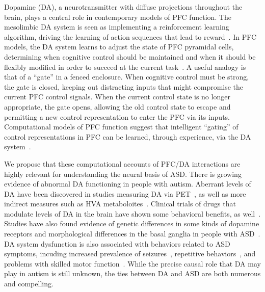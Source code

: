 Dopamine (DA), a neurotransmitter with diffuse projections throughout the brain, plays a central role in contemporary models of PFC function. The mesolimbic DA system is seen as implementing a reinforcement learning algorithm, driving the learning of action sequences that lead to reward~\cite{MontaguePR:1996:Dopamine,BartoAG:1994:TDLearning}. In PFC models, the DA system learns to adjust the state of PFC pyramidal cells, determining when cognitive control should be maintained and when it should be flexibly modified in order to succeed at the current task~\cite{BraverTS:2000:Control}. A useful analogy is that of a ``gate'' in a fenced enclosure. When cognitive control must be strong, the gate is closed, keeping out distracting inputs that might compromise the current PFC control signals. When the current control state is no longer appropriate, the gate opens, allowing the old control state to escape and permitting a new control representation to enter the PFC via its inputs.  Computational models of PFC function suggest that intelligent ``gating'' of control representations in PFC can be learned, through experience, via the DA system~\cite{OReillyRC:2002:IDED}. 

We propose that these computational accounts of PFC/DA interactions are highly relevant for understanding the neural basis of ASD. There is growing evidence of abnormal DA functioning in people with autism. Aberrant levels of DA have been discovered in studies measuring DA via PET~\cite{FernellE:1997:AutismPET}, as well as more indirect measures such as HVA metaboloites~\cite{MartineauJ:1992:AutismDopamine}. Clinical trials of drugs that modulate levels of DA in the brain have shown some behavioral benefits, as well~\cite{PoseyDJ:2000:AutismDopamine}. Studies have also found evidence of genetic differences in some kinds of dopamine receptors and morphological differences in the basal ganglia in people with ASD~\cite{StaalW:2012:DopamineASDGenetics,QuiA:2010:ASDMotor}. DA system dysfunction is also associated with behaviors related to ASD symptoms, incuding increased prevalence of seizures~\cite{TuchmanR:2002:EpilepsyAutism}, repetitive behaviors~\cite{CanalesJJ:2000:Stereotypy}, and problems with skilled motor function~\cite{RinehartNJ:2001:AutismMovement}.
While the precise causal role that DA may play in autism is still unknown, the ties between DA and ASD are both numerous and compelling.

